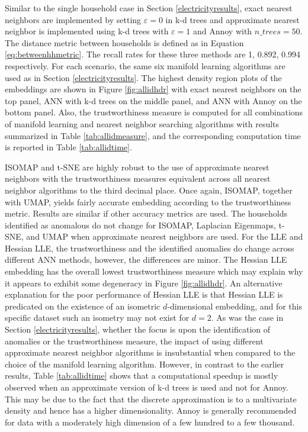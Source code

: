 \documentclass[11pt,a4paper,]{article}
\begin{document}
Similar to the single household case in Section \ref{electricityresults}, exact nearest neighbors are implemented by setting \(\varepsilon=0\) in k-d trees and approximate nearest neighbor is implemented using k-d trees with \(\varepsilon=1\) and Annoy with \(\textit{n\_trees}=50\). The distance metric between households is defined as in Equation \eqref{eq:betweenhhmetric}. The recall rates for these three methods are 1, 0.892, 0.994 respectively. For each scenario, the same six manifold learning algorithms are used as in Section \ref{electricityresults}. The highest density region plots of the embeddings are shown in Figure \ref{fig:allidhdr} with exact nearest neighbors on the top panel, ANN with k-d trees on the middle panel, and ANN with Annoy on the bottom panel. Also, the trustworthiness measure is computed for all combinations of manifold learning and nearest neighbor searching algorithms with results summarized in Table \ref{tab:allidmeasure}, and the corresponding computation time is reported in Table \ref{tab:allidtime}.

ISOMAP and t-SNE are highly robust to the use of approximate nearest neighbors with the trustworthiness measures equivalent across all nearest neighbor algorithms to the third decimal place. Once again, ISOMAP, together with UMAP, yields fairly accurate embedding according to the trustworthiness metric. Results are similar if other accuracy metrics are used. The households identified as anomalous do not change for ISOMAP, Laplacian Eigenmaps, t-SNE, and UMAP when approximate nearest neighbors are used. For the LLE and Hessian LLE, the trustworthiness and the identified anomalies do change across different ANN methods, however, the differences are minor. The Hessian LLE embedding has the overall lowest trustworthiness measure which may explain why it appears to exhibit some degeneracy in Figure \ref{fig:allidhdr}. An alternative explanation for the poor performance of Hessian LLE is that Hessian LLE is predicated on the existence of an isometric \(d\)-dimensional embedding, and for this specific dataset such an isometry may not exist for \(d=2\). As was the case in Section \ref{electricityresults}, whether the focus is upon the identification of anomalies or the trustworthiness measure, the impact of using different approximate nearest neighbor algorithms is insubstantial when compared to the choice of the manifold learning algorithm. However, in contrast to the earlier results, Table \ref{tab:allidtime} shows that a computational speedup is mostly observed when an approximate version of k-d trees is used and not for Annoy. This may be due to the fact that the discrete approximation is to a multivariate density and hence has a higher dimensionality. Annoy is generally recommended for data with a moderately high dimension of a few hundred to a few thousand.
\end{document}
